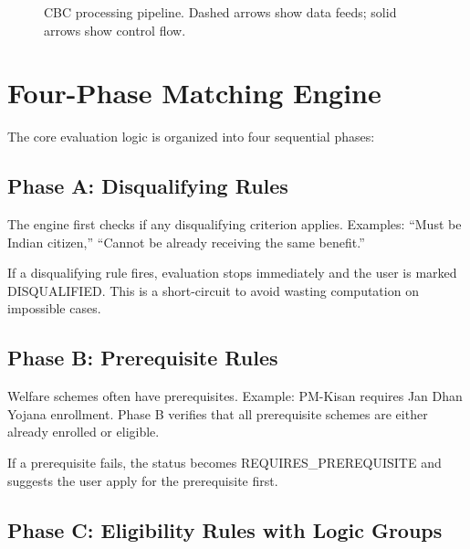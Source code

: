 \documentclass[11pt,a4paper]{report}
\begin{document}
\begin{figure}[H]
\caption{CBC processing pipeline. Dashed arrows show data feeds; solid arrows show control flow.}
\label{fig:pipeline}
\end{figure}

\pagebreak
\section{Four-Phase Matching Engine}

The core evaluation logic is organized into four sequential phases:

\subsection{Phase A: Disqualifying Rules}

The engine first checks if any disqualifying criterion applies. Examples: ``Must be Indian citizen,'' ``Cannot be already receiving the same benefit.''

If a disqualifying rule fires, evaluation stops immediately and the user is marked DISQUALIFIED. This is a short-circuit to avoid wasting computation on impossible cases.

\subsection{Phase B: Prerequisite Rules}

Welfare schemes often have prerequisites. Example: PM-Kisan requires Jan Dhan Yojana enrollment. Phase B verifies that all prerequisite schemes are either already enrolled or eligible.

If a prerequisite fails, the status becomes REQUIRES\_PREREQUISITE and suggests the user apply for the prerequisite first.

\subsection{Phase C: Eligibility Rules with Logic Groups}
\end{document}
